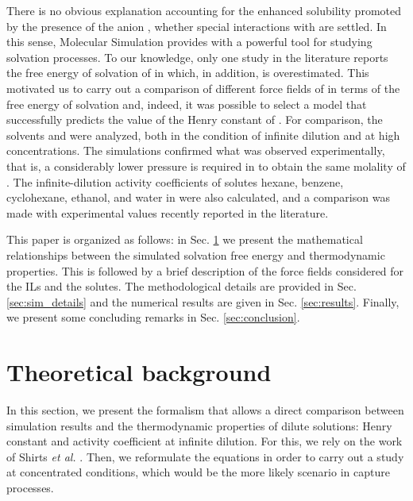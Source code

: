 \documentclass[3p,twocolumn]{elsarticle}
\begin{document}
There is no obvious explanation accounting for the enhanced solubility promoted by the presence of the anion \ce{[B(CN)_4]^-]}, whether special interactions with  are settled. In this sense, Molecular Simulation provides with a powerful tool for studying solvation processes. To our knowledge, only one study in the literature reports the free energy of solvation of  in \ce{[emim][B(CN)_4]} \cite{Liu_2014_1} which, in addition, is overestimated. This motivated us to carry out a comparison of different force fields of \ce{[emim][B(CN)_4]} in terms of the free energy of solvation and, indeed,  it was possible to select a model that successfully predicts the value of the Henry constant of . For comparison, the solvents \ce{[emim][B(CN)_4]} and \ce{[emim][NTf_2]} were analyzed, both in the condition of infinite dilution and at high concentrations. The simulations confirmed what was observed experimentally, that is, a considerably lower pressure is required in \ce{[emim][B(CN)_4]} to obtain the same molality of . The infinite-dilution activity coefficients of solutes hexane, benzene, cyclohexane, ethanol, and water in \ce{[emim][B(CN)_4]} were also calculated, and a comparison was made with experimental values recently reported in the literature.

This paper is organized as follows: in Sec. \ref{sec:theory} we present the mathematical relationships between the simulated solvation free energy and thermodynamic properties. This is followed by a brief description of the force fields considered for the ILs and the solutes. The methodological details are provided in Sec. \ref{sec:sim_details} and the numerical results are given in Sec. \ref{sec:results}. Finally, we present some concluding remarks in Sec. \ref{sec:conclusion}.

\section{Theoretical background}
\label{sec:theory}

In this section, we present the formalism that allows a direct comparison between simulation results and the thermodynamic properties of dilute solutions: Henry constant and activity coefficient at infinite dilution. For this, we rely on the work of Shirts \textit{et al.} \cite{Shirts_2003}. Then, we reformulate the equations in order to carry out a study at concentrated conditions, which would be the more likely scenario in  capture processes.
\end{document}
